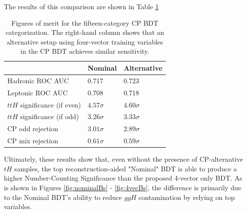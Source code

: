The results of this comparison are shown in Table \ref{tab:appsigs}

\begin{table}[ht]
\begin{center}
\begin{tabular}{lll}
 & Nominal & Alternative \\ \hline
Hadronic ROC AUC & 0.717 & 0.723 \\
Leptonic ROC AUC & 0.708 & 0.718 \\ \hline
$ttH$ significance (if even)& $4.57\sigma$ & $4.60\sigma$ \\
$ttH$ significance (if odd)& $3.26\sigma$ & $3.33\sigma$ \\ \hline
CP odd rejection & $3.01\sigma$ & $2.89\sigma$\\
CP mix rejection & $0.61\sigma$ & $0.59\sigma$ \\ \hline
\hline
\end{tabular}
\end{center}
\vspace{-0.5cm}
\caption{Figures of merit for the fifteen-category CP BDT categorization.  The right-hand column shows that an alternative setup using four-vector training variables in the CP BDT achieves similar sensitivity.}
\label{tab:appsigs}
\end{table}
Ultimately, these results show that, even without the presence of CP-alternative $tH$ samples, the top reconstruction-aided "Nominal" BDT is able to produce a higher Number-Counting Significance than the proposed 4-vector only BDT. As is shown in Figures \ref{fig:nominalBs} - \ref{fig:4vecBs}, the difference is primarily due to the Nominal BDT's ability to reduce $ggH$ contamination by relying on top variables. 

